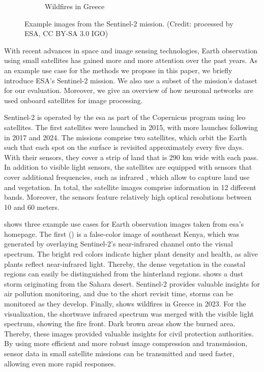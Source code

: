 \documentclass[conference]{IEEEtran}
\newcommand\sentinelii{Sentinel-2\xspace}
\begin{document}
\begin{figure}
\begin{subfigure}{.3\linewidth}
    \caption{Wildfires in Greece}
    \label{fig:sentinel_greece}
  \end{subfigure}

  \caption{Example images from the \sentinelii mission. (Credit: processed by ESA, CC BY-SA 3.0 IGO)}
  \label{fig:sentinelii}
\end{figure}


With recent advances in space and image sensing technologies, Earth observation using small satellites has gained more and more attention over the past years.
As an example use case for the methods we propose in this paper, we briefly introduce ESA's \sentinelii mission.
We also use a subset of the mission's dataset for our evaluation.
Moreover, we give an overview of how neuronal networks are used onboard satellites for image processing.

\sentinelii \cite{sentinel2} is operated by the \ac{esa} as part of the Copernicus program using \ac{leo} satellites.
The first satellites were launched in 2015, with more launches following in 2017 and 2024.
The missions comprise two satellites, which orbit the Earth such that each spot on the surface is revisited approximately every five days.
With their sensors, they cover a strip of land that is 290 km wide with each pass.
In addition to visible light sensors, the satellites are equipped with sensors that cover additional frequencies, such as infrared \cite{sentinel-2-user-handbook}, which allow to capture land use and vegetation.
In total, the satellite images comprise information in 12 different bands.
Moreover, the sensors feature relatively high optical resolutions between 10 and 60 meters.

 shows three example use cases for Earth observation images taken from \ac{esa}'s homepage.
The first () is a false-color image of southeast Kenya, which was generated by overlaying \sentinelii's near-infrared channel onto the visual spectrum.
The bright red colors indicate higher plant density and health, as alive plants reflect near-infrared light.
Thereby, the dense vegetation in the coastal regions can easily be distinguished from the hinterland regions.
 shows a dust storm originating from the Sahara desert.
\sentinelii provides valuable insights for air pollution monitoring, and due to the short revisit time, storms can be monitored as they develop.
Finally,  shows wildfires in Greece in 2023.
For the visualization, the shortwave infrared spectrum was merged with the visible light spectrum, showing the fire front.
Dark brown areas show the burned area.
Thereby, these images provided valuable insights for civil protection authorities.
By using more efficient and more robust image compression and transmission, sensor data in small satellite missions can be transmitted and used faster, allowing even more rapid responses.
\end{document}

